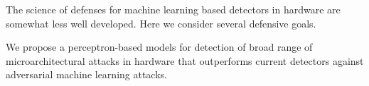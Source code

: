 The science of defenses for machine learning based  detectors in hardware are somewhat less well developed. Here we consider several defensive goals. 

We propose a perceptron-based models for detection of broad range of microarchitectural attacks in hardware that outperforms current  detectors against adversarial machine learning attacks. 





















